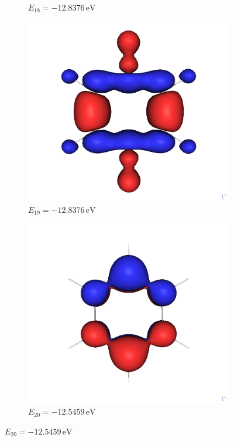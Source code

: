 \documentclass[9pt]{report}
\begin{document}
\begin{figure}[H]
\begin{subfigure}[b]{0.23\textwidth}
		\caption[]{{\small $E_{18}=-12.8376\,\mathrm{eV}$}}    
	\end{subfigure}
	\begin{subfigure}[b]{0.23\textwidth}   
		\centering 
		\includegraphics[width=\textwidth]{Benzol-19.png}
		\caption[]{{\small $E_{19}=-12.8376\,\mathrm{eV}$}}    
	\end{subfigure}
	\hfill
	\begin{subfigure}[b]{0.23\textwidth}   
		\centering 
		\includegraphics[width=\textwidth]{Benzol-20.png}
		\caption[]{{\small $E_{20}=-12.5459\,\mathrm{eV}$}}    
	\end{subfigure}
\end{figure}
\end{document}
